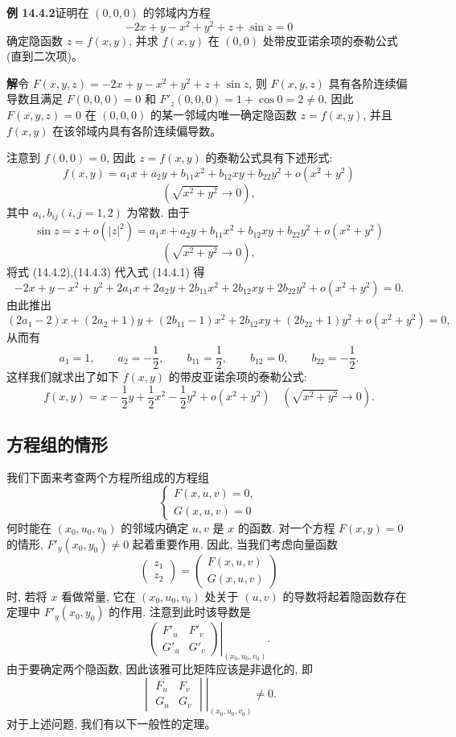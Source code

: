\documentclass[UTF8,12pt,a4paper,fontset=fandol]{ctexart}
\begin{document}
\noindent\textbf{例 14.4.2}\quad 证明在 $(0,0,0)$ 的邻域内方程
\begin{equation}
  -2x+y-x^2+y^2+z+\sin z=0
  \tag{14.4.1}
\end{equation}
确定隐函数 $z=f(x,y)$, 并求 $f(x,y)$ 在 $(0,0)$ 处带皮亚诺余项的泰勒公式 (直到二次项)。

\noindent\textbf{解}\quad 令 $F(x,y,z)=-2x+y-x^2+y^2+z+\sin z$, 则 $F(x,y,z)$ 具有各阶连续偏导数且满足 $F(0,0,0)=0$ 和 $F'_z(0,0,0)=1+\cos0=2\ne0$. 因此 $F(x,y,z)=0$ 在 $(0,0,0)$ 的某一邻域内唯一确定隐函数 $z=f(x,y)$, 并且 $f(x,y)$ 在该邻域内具有各阶连续偏导数。

注意到 $f(0,0)=0$, 因此 $z=f(x,y)$ 的泰勒公式具有下述形式:
\begin{equation}
  f(x,y)=a_1x+a_2y+b_{11}x^2+b_{12}xy+b_{22}y^2+o(x^2+y^2)
  \tag{14.4.2}
\end{equation}
\[
  (\sqrt{x^2+y^2}\to0),
\]
其中 $a_i,b_{ij}(i,j=1,2)$ 为常数. 由于
\[
  \sin z=z+o(|z|^2)
  =a_1x+a_2y+b_{11}x^2+b_{12}xy+b_{22}y^2+o(x^2+y^2)
  \tag{14.4.3}
\]
\[
  (\sqrt{x^2+y^2}\to0),
\]
将式 (14.4.2),(14.4.3) 代入式 (14.4.1) 得
\[
  -2x+y-x^2+y^2+2a_1x+2a_2y+2b_{11}x^2+2b_{12}xy+2b_{22}y^2+o(x^2+y^2)=0.
\]
由此推出
\[
  (2a_1-2)x+(2a_2+1)y+(2b_{11}-1)x^2
  +2b_{12}xy+(2b_{22}+1)y^2+o(x^2+y^2)=0,
\]
从而有
\[
  a_1=1,\qquad a_2=-\frac12,\qquad b_{11}=\frac12,\qquad
  b_{12}=0,\qquad b_{22}=-\frac12.
\]
这样我们就求出了如下 $f(x,y)$ 的带皮亚诺余项的泰勒公式:
\[
  f(x,y)=x-\frac12y+\frac12x^2-\frac12y^2+o(x^2+y^2)
  \quad(\sqrt{x^2+y^2}\to0).
\]

\subsection{方程组的情形}

我们下面来考查两个方程所组成的方程组
\[
  \begin{cases}
    F(x,u,v)=0,\\
    G(x,u,v)=0
  \end{cases}
\]
何时能在 $(x_0,u_0,v_0)$ 的邻域内确定 $u,v$ 是 $x$ 的函数. 对一个方程 $F(x,y)=0$ 的情形, $F'_y(x_0,y_0)\ne0$ 起着重要作用. 因此, 当我们考虑向量函数
\[
  \begin{pmatrix}
    z_1\\
    z_2
  \end{pmatrix}
  =
  \begin{pmatrix}
    F(x,u,v)\\
    G(x,u,v)
  \end{pmatrix}
\]
时, 若将 $x$ 看做常量, 它在 $(x_0,u_0,v_0)$ 处关于 $(u,v)$ 的导数将起着隐函数存在定理中 $F'_y(x_0,y_0)$ 的作用. 注意到此时该导数是
\[
  \left.
  \begin{pmatrix}
    F'_u & F'_v\\
    G'_u & G'_v
  \end{pmatrix}
  \right|_{(x_0,u_0,v_0)}.
\]
由于要确定两个隐函数, 因此该雅可比矩阵应该是非退化的, 即
\[
  \left.
  \begin{vmatrix}
    F_u & F_v\\
    G_u & G_v
  \end{vmatrix}
  \right|_{(x_0,u_0,v_0)}\ne0.
\]
对于上述问题, 我们有以下一般性的定理。
\end{document}
